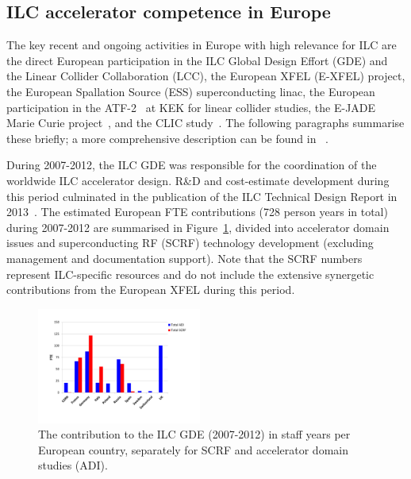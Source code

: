 \documentclass[%
 reprint,
 floatfix,
 amsmath,amssymb,
 aps,
]{revtex4-1}
\begin{document}
\subsection{ILC accelerator competence in Europe~\label{sec:acc:competence}}

The key recent and ongoing activities in Europe with high relevance for ILC are the direct European participation in the ILC Global Design Effort (GDE) and the Linear Collider Collaboration (LCC),
the European XFEL (E-XFEL) project, the European Spallation Source (ESS) superconducting linac, the European 
participation in the ATF-2~\cite{Grishanov:2005ek,Grishanov:2006kx} at KEK for linear collider studies, the E-JADE Marie 
Curie project~\cite{ejade}, and the CLIC study~\cite{Aicheler:2012bya,Linssen:2012hp}. The following paragraphs 
summarise these briefly; a more comprehensive description can be found in ~\cite{ejade-report}. 

During 2007-2012, the ILC GDE was responsible for the coordination of the worldwide ILC accelerator design. 
R\&D and cost-estimate development during this period culminated in the publication of the ILC Technical Design Report in 2013~\cite{Behnke:2013xla}. 
The estimated European FTE contributions (728 person years in total) during 2007-2012 are summarised in Figure~\ref{fig:PrePrep:ilcgde4}, 
divided into accelerator domain issues and superconducting RF (SCRF) technology development (excluding management and documentation support). 
Note that the SCRF numbers represent ILC-specific resources and do not include the extensive synergetic contributions from the European XFEL during this period.

\begin{figure}[htbp]
\includegraphics[width=0.48\textwidth]{figures/EU-GDE-FTE-columns-per-country.pdf}
\caption{\label{fig:PrePrep:ilcgde4} The contribution to the ILC GDE (2007-2012) in staff years per European country, separately for SCRF and accelerator domain studies (ADI).}
\end{figure}

\end{document}
